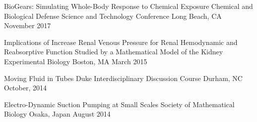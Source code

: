 \begin{cventries}
      \cventry
    {BioGears: Simulating Whole-Body Response to Chemical Exposure} %
    {Chemical and Biological Defense Science and Technology Conference} %
    {Long Beach, CA} %
    {November 2017} %
    {
    }

     \cventry
    {Implications of Increase Renal Venous Pressure for Renal Hemodynamic and Reabsorptive Function Studied by a Mathematical Model of the Kidney} %
    {Experimental Biology} %
    {Boston, MA} %
    {March 2015} %
    {
    }

    \cventry
    {Moving Fluid in Tubes} %
    {Duke Interdisciplinary Discussion Course} %
    {Durham, NC} %
    {October, 2014} %
    {
    }

    \cventry
    {Electro-Dynamic Suction Pumping at Small Scales} %
    {Society of Mathematical Biology} %
    {Osaka, Japan} %
    {August 2014} %
    {
    }



\end{cventries}
